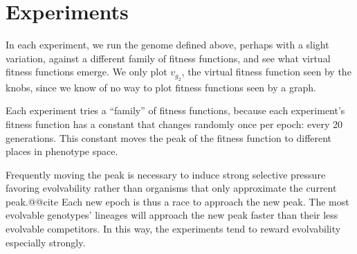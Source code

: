 \documentclass[letterpaper]{article}
\begin{document}
\section{Experiments}

In each experiment, we run the genome defined above, perhaps with a slight
variation, against a different family of fitness functions, and see what
virtual fitness functions emerge. We only plot $v_{g_2}$, the virtual
fitness function seen by the knobs, since we know of no way to plot fitness
functions seen by a graph.

Each experiment tries a ``family'' of fitness functions, because each
experiment's fitness function has a constant that changes randomly once per
epoch: every 20 generations. This constant moves the peak of the fitness
function to different places in phenotype space.

Frequently moving the peak is necessary to induce strong selective pressure
favoring evolvability rather than organisms that only approximate the current
peak.@@cite Each new epoch is thus a race to approach the new peak. The most
evolvable genotypes' lineages will approach the new peak faster than their
less evolvable competitors. In this way, the experiments tend to reward
evolvability especially strongly.
\end{document}
